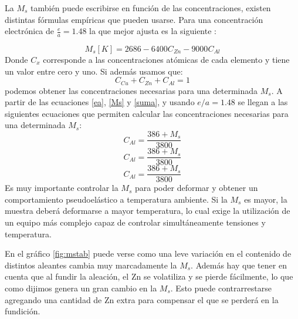 \documentclass[a4paper,12pt,fleqn,twoside,openany]{book}
\begin{document}
La $M_{s}$ también puede escribirse en función de las concentraciones, existen 
distintas fórmulas empíricas que pueden usarse. Para una concentración electrónica de $\frac{e}{a}=1.48$ la que mejor ajusta es la siguiente \cite{pierre}:

\begin{equation}
M_s[K]=2686-6400C_{Zn}-9000C_{Al} \label{Ms} 
\end{equation}
Donde $C_x$ corresponde a las concentraciones atómicas de cada elemento y tiene un valor entre cero y uno. Si además usamos que:
\begin{equation}
C_{Cu}+C_{Zn}+C_{Al}=1 \label{suma}
\end{equation}
podemos obtener las concentraciones necesarias para una determinada $M_{s}$. A partir de las ecuaciones \ref{ea}, \ref{Ms} y \ref{suma}, y usando $e/a=1.48$ se llegan a las siguientes ecuaciones que permiten calcular las concentraciones necesarias para una determinada $M_s$:
\begin{equation}
C_{Al}=\frac{386+M_s}{3800} 
\end{equation}
\begin{equation}
C_{Al}=\frac{386+M_s}{3800} 
\end{equation}
\begin{equation}
C_{Al}=\frac{386+M_s}{3800}
\end{equation}
Es muy importante controlar la $M_s$ para poder deformar y obtener un comportamiento pseudoelástico a temperatura ambiente. Si la $M_{s}$ es mayor, la muestra deberá deformarse a mayor temperatura, lo 
cual exige la utilización de un equipo más complejo capaz de controlar simultáneamente tensiones y temperatura.



En el gráfico \ref{fig:mstab} puede verse como una leve variación en el contenido de distintos aleantes cambia muy marcadamente la $M_s$. Además hay que 
tener en cuenta que al fundir la aleación, el Zn se volatiliza y se pierde fácilmente, lo que como dijimos genera un gran cambio en la $M_s$. Esto 
puede contrarrestarse agregando una cantidad de Zn extra para compensar el que se perderá en la fundición.

\end{document}
